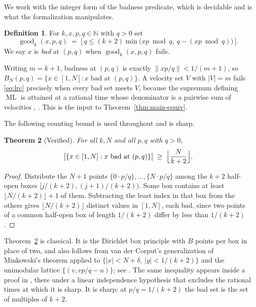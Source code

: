 \documentclass[11pt]{amsart}
\theoremstyle{plain}
\newtheorem{theorem}{Theorem}[section]
\theoremstyle{definition}
\newtheorem{definition}[theorem]{Definition}
\newcommand{\Norm}[1]{\left\lVert #1 \right\rVert}
\newcommand{\ML}{\operatorname{ML}}
\begin{document}
We work with the integer form of the badness predicate, which is decidable and is what the
formalization manipulates.

\begin{definition}\label{def:good}
For $k, x, p, q \in \mathbb{N}$ with $q > 0$ set
\[
  \operatorname{good}_k(x,p,q) \;=\;
  \bigl[\, q \le (k+2)\min\bigl(xp \bmod q,\ q - (xp \bmod q)\bigr) \,\bigr].
\]
We say $x$ is \emph{bad} at $(p,q)$ when $\operatorname{good}_k(x,p,q)$ fails.
\end{definition}

Writing $m = k+1$, badness at $(p,q)$ is exactly $\Norm{xp/q} < 1/(m+1)$, so
$B_N(p,q) = \{x \in [1,N] : x \text{ bad at } (p,q)\}$. A velocity set $V$ with $|V| = m$ fails
\eqref{eq:lrc} precisely when every bad set meets $V$, because the supremum defining $\ML$ is
attained at a rational time whose denominator is a pairwise sum of velocities
\cite[eq.~(4)]{PS}, \cite{Har,CG}. This is the input to
Theorem~\ref{thm:main-equiv}.

The following counting bound is used throughout and is sharp.

\begin{theorem}[Verified]\label{thm:mincount}
For all $k, N$ and all $p,q$ with $q > 0$,
\[
  \bigl|\{x \in [1,N] : x \text{ bad at } (p,q)\}\bigr| \;\ge\; \Bigl\lfloor \frac{N}{k+2} \Bigr\rfloor .
\]
\end{theorem}

\begin{proof}
Distribute the $N+1$ points $\{0 \cdot p/q\}, \dots, \{N \cdot p/q\}$ among the $k+2$ half-open
boxes $[j/(k+2), (j+1)/(k+2))$. Some box contains at least $\lfloor N/(k+2)\rfloor + 1$ of them.
Subtracting the least index in that box from the others gives $\lfloor N/(k+2)\rfloor$ distinct
values in $[1,N]$, each bad, since two points of a common half-open box of length $1/(k+2)$ differ
by less than $1/(k+2)$.
\end{proof}

Theorem~\ref{thm:mincount} is classical. It is the Dirichlet box principle with $B$ points per box
in place of two, and also follows from van der Corput's generalization of Minkowski's theorem
applied to $\{|x| < N + \delta,\ |y| < 1/(k+2)\}$ and the unimodular lattice $\{(v, vp/q - u)\}$;
see \cite{Cassels}. The same inequality appears inside a proof in \cite[eq.~(1.34)]{BHV}, there
under a linear independence hypothesis that excludes the rational times at which it is sharp. It is
sharp: at $p/q = 1/(k+2)$ the bad set is the set of multiples of $k+2$.
\end{document}

